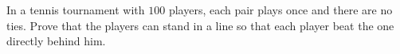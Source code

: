 In a tennis tournament with $100$ players, each pair plays once and there are no ties. Prove that the players can stand in a line so that each player beat the one directly behind him.

